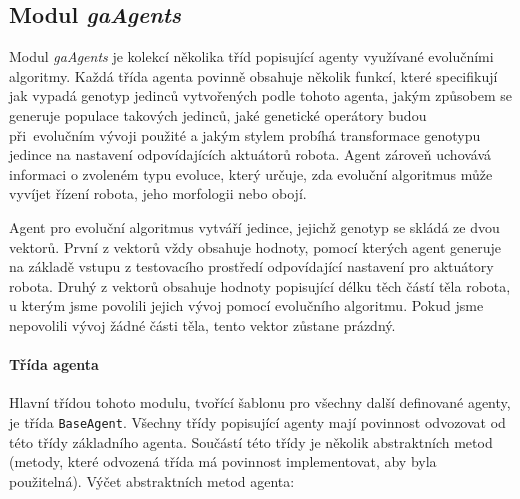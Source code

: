 \subsection{Modul \emph{gaAgents}} \label{imp:gaAgents}
Modul \emph{gaAgents} je kolekcí několika tříd popisující agenty využívané
evolučními algoritmy. Každá třída agenta povinně obsahuje několik funkcí, které
specifikují jak vypadá genotyp jedinců vytvořených podle tohoto agenta, jakým
způsobem se generuje populace takových jedinců, jaké genetické operátory budou
při~evolučním vývoji použité a jakým stylem probíhá transformace genotypu
jedince na nastavení odpovídajících aktuátorů robota. Agent zároveň uchovává
informaci o zvoleném typu evoluce, který určuje, zda evoluční algoritmus může
vyvíjet řízení robota, jeho morfologii nebo obojí.

Agent pro evoluční algoritmus vytváří jedince, jejichž genotyp se skládá ze
dvou vektorů. První z vektorů vždy obsahuje hodnoty, pomocí kterých agent
generuje na základě vstupu z testovacího prostředí odpovídající nastavení pro
aktuátory robota. Druhý z vektorů obsahuje hodnoty popisující délku těch částí
těla robota, u kterým jsme povolili jejich vývoj pomocí evolučního algoritmu.
Pokud jsme nepovolili vývoj žádné části těla, tento vektor zůstane prázdný.

\paragraph{Třída agenta}
Hlavní třídou tohoto modulu, tvořící šablonu pro všechny další definované
agenty, je třída \texttt{BaseAgent}. Všechny třídy popisující agenty mají
povinnost odvozovat od této třídy základního agenta. Součástí této třídy je
několik abstraktních metod (metody, které odvozená třída má povinnost
implementovat, aby byla použitelná). Výčet abstraktních metod agenta:

